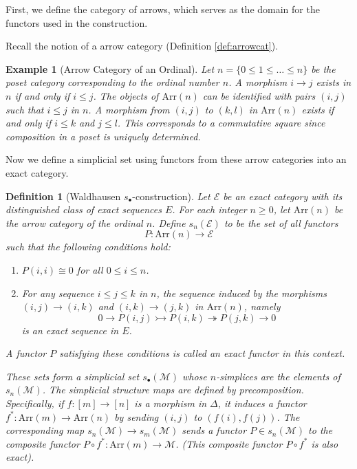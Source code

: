 \documentclass[12pt]{report}
\numberwithin{equation}{section}
\newtheorem{definition}[dummy]{Definition}
\newtheorem{example}[dummy]{Example}
\begin{document}
	
	First, we define the category of arrows, which serves as the domain for the functors used in the construction.
	
	Recall the notion of a arrow category (Definition \ref{def:arrowcat}).
	
	\begin{example}[Arrow Category of an Ordinal]
		Let $n = \{0 \leq 1 \leq \dots \leq n\}$ be the poset category corresponding to the ordinal number $n$. A morphism $i \to j$ exists in $n$ if and only if $i \leq j$. The objects of $\mathrm{Arr}(n)$ can be identified with pairs $(i, j)$ such that $i \leq j$ in $n$. A morphism from $(i, j)$ to $(k, l)$ in $\mathrm{Arr}(n)$ exists if and only if $i \leq k$ and $j \leq l$. This corresponds to a commutative square since composition in a poset is uniquely determined.
	\end{example}
	
	Now we define a simplicial set using functors from these arrow categories into an exact category.
	
	\begin{definition}[Waldhausen \( s_\bullet \)-construction]
		Let $\mathcal{E}$ be an exact category with its distinguished class of exact sequences $E$. For each integer $n \geq 0$, let $\mathrm{Arr}(n)$ be the arrow category of the ordinal $n$.
		Define $s_n(\mathcal{E})$ to be the set of all functors
		\[ P: \mathrm{Arr}(n) \to \mathcal{E} \]
		such that the following conditions hold:
		\begin{enumerate}
			\item $P(i, i) \cong 0$ for all $0 \leq i \leq n$.
			\item For any sequence $i \leq j \leq k$ in $n$, the sequence induced by the morphisms $(i,j) \to (i,k)$ and $(i,k) \to (j,k)$ in $\mathrm{Arr}(n)$, namely
			\[ 0 \to P(i, j) \rightarrowtail P(i, k) \twoheadrightarrow P(j, k) \to 0 \]
			is an exact sequence in $E$.
		\end{enumerate}
		A functor $P$ satisfying these conditions is called an exact functor in this context.
		
		These sets form a simplicial set $s_\bullet(\mathcal{M})$ whose $n$-simplices are the elements of $s_n(\mathcal{M})$. The simplicial structure maps are defined by precomposition. Specifically, if $f: [m] \to [n]$ is a morphism in $\Delta$, it induces a functor $f^*: \mathrm{Arr}(m) \to \mathrm{Arr}(n)$ by sending $(i, j)$ to $(f(i), f(j))$. The corresponding map $s_n(\mathcal{M}) \to s_m(\mathcal{M})$ sends a functor $P \in s_n(\mathcal{M})$ to the composite functor $P \circ f^*: \mathrm{Arr}(m) \to \mathcal{M}$. (This composite functor $P \circ f^*$ is also exact).
	\end{definition}
	
\end{document}

